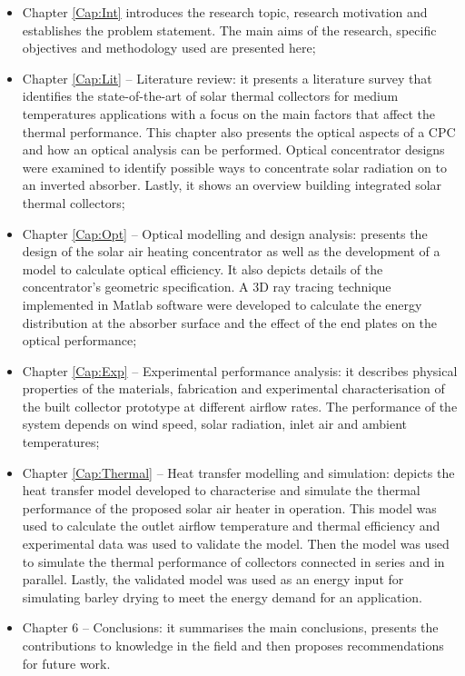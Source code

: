 \begin{itemize}
	\item Chapter \ref{Cap:Int} introduces the research topic, research motivation and establishes the problem statement. The main aims of the research, specific objectives and methodology used are presented here;
	\item Chapter \ref{Cap:Lit} -- Literature review: it presents a literature survey that identifies the state-of-the-art of solar thermal collectors for medium temperatures applications with a focus on the main factors that affect the thermal performance. This chapter also presents the optical aspects of a CPC and how an optical analysis can be performed. Optical concentrator designs were examined to identify possible ways to concentrate solar radiation on to an inverted absorber. Lastly, it shows an overview building integrated solar thermal collectors;
	\item Chapter \ref{Cap:Opt} -- Optical modelling and design analysis: presents the design of the solar air heating concentrator as well as the development of a model to calculate optical efficiency. It also depicts details of the concentrator's geometric specification. A 3D ray tracing technique implemented in Matlab software were developed to calculate the energy distribution at the absorber surface and the effect of the end plates on the optical performance;
	\item Chapter \ref{Cap:Exp} -- Experimental performance analysis: it describes physical properties of the materials, fabrication and experimental characterisation of the built collector prototype at different airflow rates. The performance of the system depends on wind speed, solar radiation, inlet air and ambient temperatures;
	\item Chapter \ref{Cap:Thermal} -- Heat transfer modelling and simulation: depicts the heat transfer model developed to characterise and simulate the thermal performance of the proposed solar air heater in operation. This model was used to calculate the outlet airflow temperature and thermal efficiency and experimental data was used to validate the model. Then the model was used to simulate the thermal performance of collectors connected in series and in parallel. Lastly, the validated model was used as an energy input for simulating barley drying to meet the energy demand for an application.
	\item Chapter 6 -- Conclusions: it summarises the main conclusions, presents the contributions to knowledge in the field and then proposes recommendations for future work.
\end{itemize}

